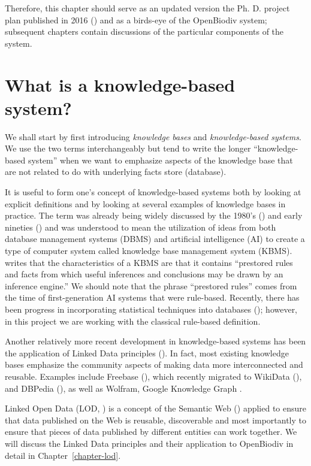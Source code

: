 Therefore, this chapter should serve as an updated version the Ph. D. project plan published in 2016 (\cite{senderov_open_2016}) and as a birds-eye of the OpenBiodiv system; subsequent chapters contain discussions of the particular components of the system.

\section{What is a knowledge-based system?}

We shall start by first introducing \emph{knowledge bases} and \emph{knowledge-based systems}.  We use the two terms interchangeably but tend to write the longer  ``knowledge-based system'' when we want to emphasize aspects of the knowledge base that are not related to do with underlying facts store (database).

It is useful to form one's concept of knowledge-based systems both by looking at explicit definitions and by looking at several examples of knowledge bases in practice. The term was already being widely discussed by the 1980's (\cite{brodie_kbms_1989}) and early nineties (\cite{harris_knowledge_1993}) and was understood to mean the utilization of ideas from both database management systems (DBMS) and artificial intelligence (AI) to create a type of computer system called knowledge base management system (KBMS). \cite{harris_knowledge_1993} writes that the characteristics of a KBMS are that it contains ``prestored rules and facts from which useful inferences and conclusions may be drawn by an inference engine.''  We should note that the phrase ``prestored rules'' comes from the time of first-generation AI systems that were rule-based. Recently, there has been progress in incorporating statistical techniques into databases (\cite{mansinghka_bayesdb:_2015}); however, in this project we are working with the classical rule-based definition.

Another relatively more recent development in knowledge-based systems has been the application of Linked Data principles (\cite{heath_linked_2011}). In fact, most existing knowledge bases emphasize the community aspects of making data more interconnected and reusable. Examples include Freebase (\cite{bollacker_freebase:_2008}), which recently migrated to WikiData (\cite{vrandecic_wikidata:_2014, pellissier_tanon_freebase_2016}), and DBPedia (\cite{hutchison_dbpedia:_2007}), as well as Wolfram, Google Knowledge Graph .

Linked Open Data (LOD, \cite{heath_linked_2011}) is a concept of the Semantic Web (\cite{berners-lee_semantic_2001}) applied to ensure that data published on the Web is reusable, discoverable and most importantly to ensure that pieces of data published by different entities can work together.  We will discuss the Linked Data principles and their application to OpenBiodiv in detail in Chapter~\ref{chapter-lod}.

